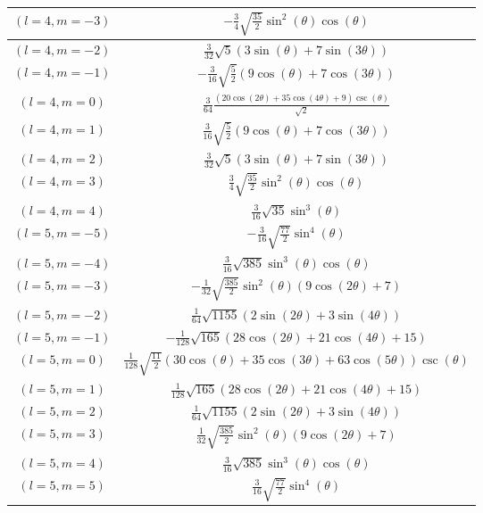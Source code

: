 \begin{center}
\begin{longtable}{|c|c|}
$(l=4, m=-3)$ & $-\frac{3}{4} \sqrt{\frac{35}{2}} \sin ^2(\theta ) \cos (\theta )$ \\ \hline
$(l=4, m=-2)$ & $\frac{3}{32} \sqrt{5} (3 \sin (\theta )+7 \sin (3 \theta ))$ \\ \hline
\rowcolor{gray!15}
$(l=4, m=-1)$ & $-\frac{3}{16} \sqrt{\frac{5}{2}} (9 \cos (\theta )+7 \cos (3 \theta ))$ \\ \hline
$(l=4, m=0)$ & $\frac{3}{64} \frac{(20 \cos (2 \theta )+35 \cos (4 \theta )+9) \csc (\theta )}{\sqrt{2}}$ \\ \hline
\rowcolor{gray!15}
$(l=4, m=1)$ & $\frac{3}{16} \sqrt{\frac{5}{2}} (9 \cos (\theta )+7 \cos (3 \theta ))$ \\ \hline
$(l=4, m=2)$ & $\frac{3}{32} \sqrt{5} (3 \sin (\theta )+7 \sin (3 \theta ))$ \\ \hline
\rowcolor{gray!15}
$(l=4, m=3)$ & $\frac{3}{4} \sqrt{\frac{35}{2}} \sin ^2(\theta ) \cos (\theta )$ \\ \hline
$(l=4, m=4)$ & $\frac{3}{16} \sqrt{35} \sin ^3(\theta )$ \\ \hline
\rowcolor{gray!15}
$(l=5, m=-5)$ & $-\frac{3}{16} \sqrt{\frac{77}{2}} \sin ^4(\theta )$ \\ \hline
$(l=5, m=-4)$ & $\frac{3}{16} \sqrt{385} \sin ^3(\theta ) \cos (\theta )$ \\ \hline
\rowcolor{gray!15}
$(l=5, m=-3)$ & $-\frac{1}{32} \sqrt{\frac{385}{2}} \sin ^2(\theta ) (9 \cos (2 \theta )+7)$ \\ \hline
$(l=5, m=-2)$ & $\frac{1}{64} \sqrt{1155} (2 \sin (2 \theta )+3 \sin (4 \theta ))$ \\ \hline
\rowcolor{gray!15}
$(l=5, m=-1)$ & $-\frac{1}{128} \sqrt{165} (28 \cos (2 \theta )+21 \cos (4 \theta )+15)$ \\ \hline
$(l=5, m=0)$ & $\frac{1}{128} \sqrt{\frac{11}{2}} (30 \cos (\theta )+35 \cos (3 \theta )+63 \cos (5 \theta )) \csc (\theta )$ \\ \hline
\rowcolor{gray!15}
$(l=5, m=1)$ & $\frac{1}{128} \sqrt{165} (28 \cos (2 \theta )+21 \cos (4 \theta )+15)$ \\ \hline
$(l=5, m=2)$ & $\frac{1}{64} \sqrt{1155} (2 \sin (2 \theta )+3 \sin (4 \theta ))$ \\ \hline
\rowcolor{gray!15}
$(l=5, m=3)$ & $\frac{1}{32} \sqrt{\frac{385}{2}} \sin ^2(\theta ) (9 \cos (2 \theta )+7)$ \\ \hline
$(l=5, m=4)$ & $\frac{3}{16} \sqrt{385} \sin ^3(\theta ) \cos (\theta )$ \\ \hline
\rowcolor{gray!15}
$(l=5, m=5)$ & $\frac{3}{16} \sqrt{\frac{77}{2}} \sin ^4(\theta )$ \\ \hline

\end{longtable}
\end{center}
